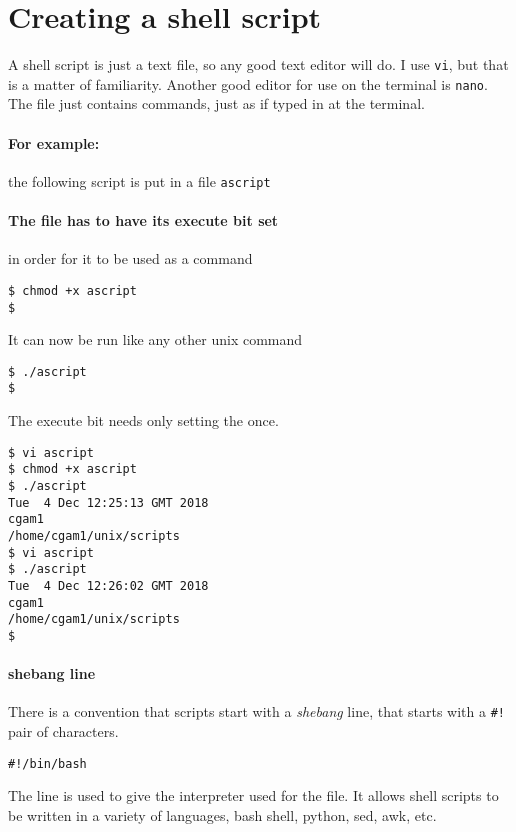 \documentclass{article}
\begin{document}
\clearpage\section{Creating a shell script}
A shell script is just a text file, so any good text editor will do.  I use
\verb'vi', but that is a matter of familiarity.  Another good editor for use
on the terminal is \verb'nano'.  The file just contains commands, just as if typed in at the terminal.


\paragraph{For example:} the following script is put in a file \texttt{ascript}
  \begin{tcolorbox}[title=script \texttt{ascript}]
    
  \end{tcolorbox}

\paragraph{The file has to have its execute bit set } in order for it
to be used as a command
\begin{tcolorbox}[colframe=Green]
\begin{verbatim}
$ chmod +x ascript
$
\end{verbatim}
\end{tcolorbox}
It can now be run like any other unix command
\begin{tcolorbox}[colframe=Green]
\begin{verbatim}
$ ./ascript
$
\end{verbatim}
\end{tcolorbox}
The execute bit needs only setting the once.

\begin{tcolorbox}[colframe=Green]
\begin{verbatim}
$ vi ascript
$ chmod +x ascript
$ ./ascript
Tue  4 Dec 12:25:13 GMT 2018
cgam1
/home/cgam1/unix/scripts
$ vi ascript
$ ./ascript
Tue  4 Dec 12:26:02 GMT 2018
cgam1
/home/cgam1/unix/scripts
$
\end{verbatim}
\end{tcolorbox}

\paragraph{shebang line}
There is a convention that scripts start with a \emph{shebang} line, that
starts with a \verb'#!' pair of characters.
\begin{tcolorbox}
\begin{verbatim}
#!/bin/bash
\end{verbatim}
\end{tcolorbox}
The line is used to give the interpreter used for the file.  It allows shell
scripts to be written in a variety of languages, bash shell, python, sed, awk,
etc.
\end{document}
